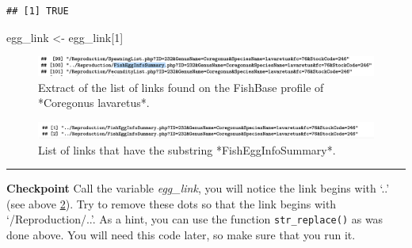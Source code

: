 \documentclass[
]{book}
\newenvironment{Shaded}{\begin{snugshade}}{\end{snugshade}}
\newcommand{\DataTypeTok}[1]{\textcolor[rgb]{0.13,0.29,0.53}{#1}}
\newcommand{\DecValTok}[1]{\textcolor[rgb]{0.00,0.00,0.81}{#1}}
\newcommand{\KeywordTok}[1]{\textcolor[rgb]{0.13,0.29,0.53}{\textbf{#1}}}
\newcommand{\NormalTok}[1]{#1}
\newcommand{\OperatorTok}[1]{\textcolor[rgb]{0.81,0.36,0.00}{\textbf{#1}}}
\newcommand{\StringTok}[1]{\textcolor[rgb]{0.31,0.60,0.02}{#1}}
\begin{document}
\begin{Shaded}
\end{Shaded}

\begin{verbatim}
## [1] TRUE
\end{verbatim}

\begin{Shaded}
\begin{Highlighting}[]
\NormalTok{egg_link <-}\StringTok{ }\NormalTok{egg_link[}\DecValTok{1}\NormalTok{]}
\end{Highlighting}
\end{Shaded}

\begin{figure}
\includegraphics[width=24.97in]{./figures/eggs} \caption{Extract of the list of links found on the FishBase profile of *Coregonus lavaretus*.}\label{fig:eggs}
\end{figure}
\begin{figure}
\includegraphics[width=24.36in]{./figures/outputlink} \caption{List of links that have the substring *FishEggInfoSummary*.}\label{fig:outputlink}
\end{figure}

\begin{center}\rule{0.5\linewidth}{0.5pt}\end{center}

\textbf{Checkpoint}
Call the variable \emph{egg\_link}, you will notice the link begins with `..' (see above \ref{fig:outputlink}). Try to remove these dots so that the link begins with `/Reproduction/..'. As a hint, you can use the function \texttt{str\_replace()} as was done above. You will need this code later, so make sure that you run it.
\end{document}
